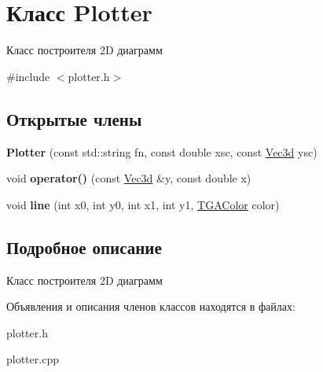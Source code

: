 \hypertarget{classPlotter}{}\section{Класс Plotter}
\label{classPlotter}


Класс построителя 2D диаграмм  




{\ttfamily \#include $<$plotter.\+h$>$}

\subsection*{Открытые члены}
\begin{DoxyCompactItemize}
\item 
\mbox{\label{classPlotter_a7d399312dc9083c9c7867908ab09dab2}} 
{\bfseries Plotter} (const std\+::string fn, const double xsc, const \hyperlink{structVec3}{Vec3d} ysc)
\item 
\mbox{\label{classPlotter_a5abb01053eab3962b30c78a3db678e22}} 
void {\bfseries operator()} (const \hyperlink{structVec3}{Vec3d} \&y, const double x)
\item 
\mbox{\label{classPlotter_a2a6c933fd57331a7643592b5e140d3ce}} 
void {\bfseries line} (int x0, int y0, int x1, int y1, \hyperlink{structTGAColor}{T\+G\+A\+Color} color)
\end{DoxyCompactItemize}


\subsection{Подробное описание}
Класс построителя 2D диаграмм 

Объявления и описания членов классов находятся в файлах\+:\begin{DoxyCompactItemize}
\item 
plotter.\+h\item 
plotter.\+cpp\end{DoxyCompactItemize}
